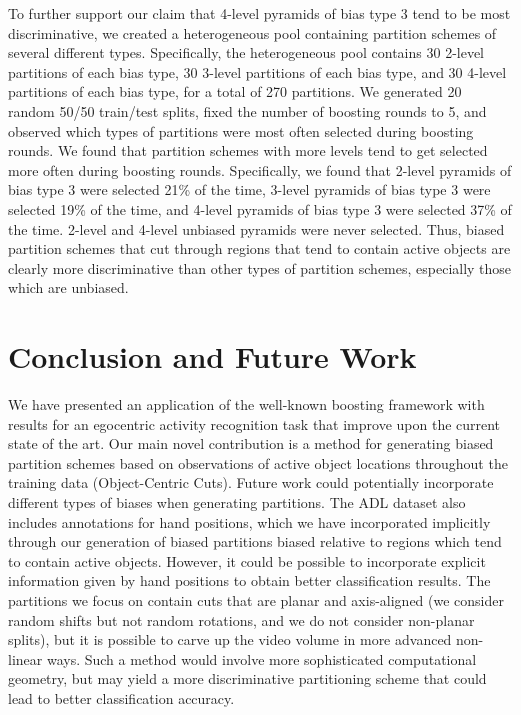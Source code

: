 \documentclass{bmvc2k}
\begin{document}
  To further support our claim that 4-level pyramids of bias type 3 tend to be most
  discriminative, we created a heterogeneous pool containing partition
  schemes of
  several different types. Specifically, the heterogeneous pool contains 30 2-level
  partitions of each bias type, 30 3-level partitions of each bias type, and
  30 4-level partitions of each bias type, for a total of 270 partitions.
  We generated 20 random 50/50 train/test splits, fixed the number of
  boosting rounds to 5, and observed which types of partitions were most
  often selected during boosting rounds.
  We found that partition schemes with more levels tend to get selected more
  often during boosting rounds.
  Specifically, we found that 2-level pyramids of bias type 3 were selected
  21\% of the time, 3-level pyramids of bias type 3 were selected 19\% of
  the time, and 4-level pyramids of bias type 3 were selected 37\% of the
  time. 2-level and 4-level unbiased pyramids were never selected. Thus,
  biased partition schemes that cut through regions that tend to contain
  active objects are clearly more discriminative than other types of
  partition schemes, especially those which are unbiased.
	
\section{Conclusion and Future Work}
	We have presented an application of the well-known boosting framework
	with results for an
  egocentric activity recognition task that improve upon the current state of
  the art.
	Our main novel contribution is a method for generating biased partition
	schemes based on observations of active object locations throughout the
  training data (Object-Centric Cuts).
	Future work could potentially incorporate different types of biases when generating
	partitions. The ADL dataset also includes annotations for hand positions,
	which we have incorporated implicitly through our generation of biased partitions
	biased relative to regions which tend to contain active objects. However,
	it could be possible to incorporate explicit information given by hand
	positions to obtain better classification results.
	The partitions we focus on contain cuts that are
  planar and axis-aligned (we consider random shifts but not random
  rotations, and we do not consider non-planar splits),
  but it is possible to carve up the
	video volume in more advanced non-linear ways. Such a method would involve more
	sophisticated computational geometry, but may yield a more discriminative
	partitioning scheme that could lead to better classification accuracy.

\end{document}
